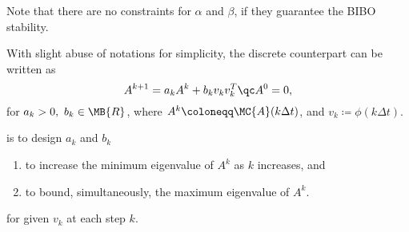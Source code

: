 \documentclass[nobib]{my-handout}
\begin{document}
Note that there are no constraints for $\alpha$ and $\beta$, if they guarantee
the BIBO stability.

With slight abuse of notations for simplicity, the discrete counterpart can be
written as
\begin{equation}\label{eq:discrete_update_law}
	A^{k+1} = a_k A^k + b_k v_k v_k^T \qc A^0 = 0,
\end{equation}
for $a_k > 0,\ b_k \in \MB{R}$, where $A^k \coloneqq \MC{A}(k \Delta t)$, and $v_k
\coloneqq \phi(k \Delta t)$.

 is to design $a_k$ and $b_k$
\begin{enumerate}
	\item to increase the minimum eigenvalue of $A^k$ as $k$ increases, and
	\item to bound, simultaneously, the maximum eigenvalue of $A^k$.
\end{enumerate}
for given $v_k$ at each step $k$.
\end{document}
